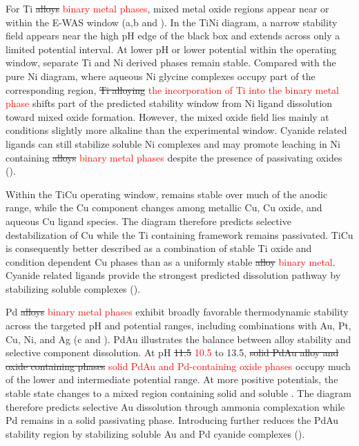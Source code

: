 \documentclass[twoside,twocolumn,9pt]{article}
\begin{document}
For Ti \sout{alloys} \textcolor{red}{binary metal phases}, mixed metal oxide regions appear near or within the E-WAS window (a,b and ). In the TiNi diagram, a narrow  stability field appears near the high pH edge of the black box and extends across only a limited potential interval. At lower pH or lower potential within the operating window, separate Ti and Ni derived phases remain stable. Compared with the pure Ni diagram, where aqueous Ni glycine complexes occupy part of the corresponding region, \sout{Ti alloying} \textcolor{red}{the incorporation of Ti into the binary metal phase} shifts part of the predicted stability window from Ni ligand dissolution toward mixed oxide formation. However, the mixed oxide field lies mainly at conditions slightly more alkaline than the experimental window. Cyanide related ligands can still stabilize soluble Ni complexes and may promote leaching in Ni containing \sout{alloys} \textcolor{red}{binary metal phases} despite the presence of passivating oxides ().

Within the TiCu operating window,  remains stable over much of the anodic range, while the Cu component changes among metallic Cu, Cu oxide, and aqueous Cu ligand species. The diagram therefore predicts selective destabilization of Cu while the Ti containing framework remains passivated. TiCu is consequently better described as a combination of stable Ti oxide and condition dependent Cu phases than as a uniformly stable \sout{alloy} \textcolor{red}{binary metal}. Cyanide related ligands provide the strongest predicted dissolution pathway by stabilizing soluble  complexes ().

Pd \sout{alloys} \textcolor{red}{binary metal phases} exhibit broadly favorable thermodynamic stability across the targeted pH and potential ranges, including combinations with Au, Pt, Cu, Ni, and Ag (c and ). PdAu illustrates the balance between alloy stability and selective component dissolution. At pH \sout{11.5} \textcolor{red}{10.5} to 13.5, \sout{solid PdAu alloy and oxide containing phases} \textcolor{red}{solid PdAu and Pd-containing oxide phases} occupy much of the lower and intermediate potential range. At more positive potentials, the stable state changes to a mixed region containing solid  and soluble . The diagram therefore predicts selective Au dissolution through ammonia complexation while Pd remains in a solid passivating phase. Introducing  further reduces the PdAu stability region by stabilizing soluble Au and Pd cyanide complexes ().
\end{document}
